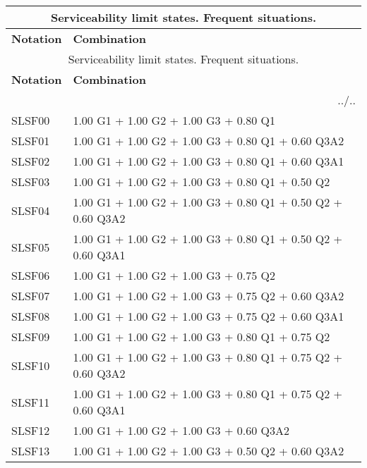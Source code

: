 \begin{center}
\begin{small}
\begin{longtable}{|l|p{10cm}|}
\hline
\multicolumn{2}{|c|}{Serviceability limit states. Frequent situations.}\\
\hline
\textbf{Notation} & \textbf{Combination} \\
\hline
\endfirsthead
\hline
\multicolumn{2}{|c|}{Serviceability limit states. Frequent situations.}\\
\hline
\textbf{Notation} & \textbf{Combination} \\
\hline
\endhead
\hline \multicolumn{2}{|r|}{{../..}} \\ \hline
\endfoot
\hline
\endlastfoot
SLSF00 & 1.00 G1 + 1.00 G2 + 1.00 G3 + 0.80 Q1\\
SLSF01 & 1.00 G1 + 1.00 G2 + 1.00 G3 + 0.80 Q1 + 0.60 Q3A2\\
SLSF02 & 1.00 G1 + 1.00 G2 + 1.00 G3 + 0.80 Q1 + 0.60 Q3A1\\
SLSF03 & 1.00 G1 + 1.00 G2 + 1.00 G3 + 0.80 Q1 + 0.50 Q2\\
SLSF04 & 1.00 G1 + 1.00 G2 + 1.00 G3 + 0.80 Q1 + 0.50 Q2 + 0.60 Q3A2\\
SLSF05 & 1.00 G1 + 1.00 G2 + 1.00 G3 + 0.80 Q1 + 0.50 Q2 + 0.60 Q3A1\\
SLSF06 & 1.00 G1 + 1.00 G2 + 1.00 G3 + 0.75 Q2\\
SLSF07 & 1.00 G1 + 1.00 G2 + 1.00 G3 + 0.75 Q2 + 0.60 Q3A2\\
SLSF08 & 1.00 G1 + 1.00 G2 + 1.00 G3 + 0.75 Q2 + 0.60 Q3A1\\
SLSF09 & 1.00 G1 + 1.00 G2 + 1.00 G3 + 0.80 Q1 + 0.75 Q2\\
SLSF10 & 1.00 G1 + 1.00 G2 + 1.00 G3 + 0.80 Q1 + 0.75 Q2 + 0.60 Q3A2\\
SLSF11 & 1.00 G1 + 1.00 G2 + 1.00 G3 + 0.80 Q1 + 0.75 Q2 + 0.60 Q3A1\\
SLSF12 & 1.00 G1 + 1.00 G2 + 1.00 G3 + 0.60 Q3A2\\
SLSF13 & 1.00 G1 + 1.00 G2 + 1.00 G3 + 0.50 Q2 + 0.60 Q3A2\\
\hline
\end{longtable}
\end{small}
\end{center}
